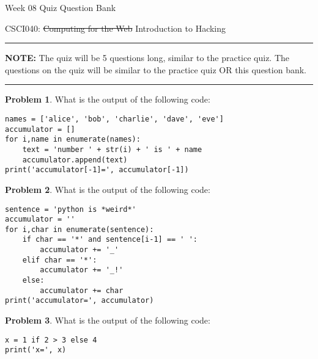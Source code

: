 \documentclass[10pt]{article}
\theoremstyle{definition}
\newtheorem{problem}{Problem}
\begin{document}
\begin{center}
    {
\Large
    Week 08 Quiz Question Bank
}

    \vspace{0.1in}
    CSCI040: \sout{Computing for the Web} Introduction to Hacking

    \vspace{0.1in}
\end{center}


\noindent
\rule{\textwidth}{0.1pt}
\vspace{0.01in}

\noindent
\textbf{NOTE:}
The quiz will be 5 questions long, similar to the practice quiz.
The questions on the quiz will be similar to the practice quiz OR this question bank.

\vspace{0.1in}
\noindent
\rule{\textwidth}{0.1pt}
\vspace{0.3in}

\begin{problem}
    What is the output of the following code:
\end{problem}
\begin{lstlisting}
names = ['alice', 'bob', 'charlie', 'dave', 'eve']
accumulator = []
for i,name in enumerate(names):
    text = 'number ' + str(i) + ' is ' + name
    accumulator.append(text)
print('accumulator[-1]=', accumulator[-1])
\end{lstlisting}
\vspace{1.5in}

\begin{problem}
    What is the output of the following code:
\end{problem}
\begin{lstlisting}
sentence = 'python is *weird*'
accumulator = ''
for i,char in enumerate(sentence):
    if char == '*' and sentence[i-1] == ' ':
        accumulator += '_'
    elif char == '*':
        accumulator += '_!'
    else:
        accumulator += char
print('accumulator=', accumulator)
\end{lstlisting}
\vspace{1.5in}

\newpage
\begin{problem}
    What is the output of the following code:
\end{problem}
\begin{lstlisting}
x = 1 if 2 > 3 else 4
print('x=', x)
\end{lstlisting}
\vspace{1.5in}
\end{document}
